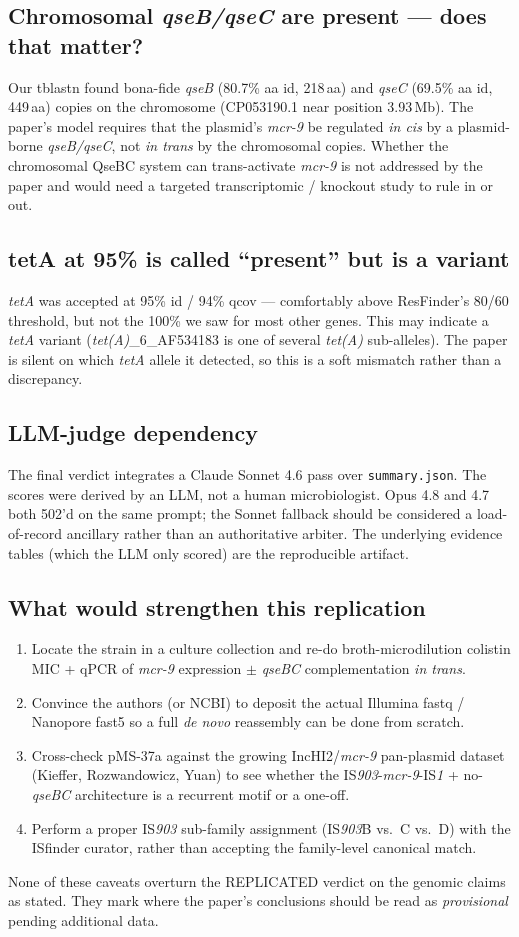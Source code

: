 \documentclass[11pt,letterpaper]{article}
\begin{document}
\subsection{Chromosomal \textit{qseB/qseC} are present --- does that matter?}
Our tblastn found bona-fide \textit{qseB} (80.7\% aa id, 218\,aa) and \textit{qseC} (69.5\% aa id, 449\,aa) copies on the chromosome (CP053190.1 near position 3.93\,Mb). The paper's model requires that the plasmid's \textit{mcr-9} be regulated \textit{in cis} by a plasmid-borne \textit{qseB/qseC}, not \textit{in trans} by the chromosomal copies. Whether the chromosomal QseBC system can trans-activate \textit{mcr-9} is not addressed by the paper and would need a targeted transcriptomic / knockout study to rule in or out.

\subsection{tetA at 95\% is called ``present'' but is a variant}
\textit{tetA} was accepted at 95\% id / 94\% qcov --- comfortably above ResFinder's 80/60 threshold, but not the 100\% we saw for most other genes. This may indicate a \textit{tetA} variant (\textit{tet(A)}\_6\_AF534183 is one of several \textit{tet(A)} sub-alleles). The paper is silent on which \textit{tetA} allele it detected, so this is a soft mismatch rather than a discrepancy.

\subsection{LLM-judge dependency}
The final verdict integrates a Claude Sonnet 4.6 pass over \texttt{summary.json}. The scores were derived by an LLM, not a human microbiologist. Opus 4.8 and 4.7 both 502'd on the same prompt; the Sonnet fallback should be considered a load-of-record ancillary rather than an authoritative arbiter. The underlying evidence tables (which the LLM only scored) are the reproducible artifact.

\subsection{What would strengthen this replication}
\begin{enumerate}
\item Locate the strain in a culture collection and re-do broth-microdilution colistin MIC + qPCR of \textit{mcr-9} expression $\pm$ \textit{qseBC} complementation \textit{in trans}.
\item Convince the authors (or NCBI) to deposit the actual Illumina fastq / Nanopore fast5 so a full \textit{de novo} reassembly can be done from scratch.
\item Cross-check pMS-37a against the growing IncHI2/\textit{mcr-9} pan-plasmid dataset (Kieffer, Rozwandowicz, Yuan) to see whether the IS\textit{903}-\textit{mcr-9}-IS\textit{1} + no-\textit{qseBC} architecture is a recurrent motif or a one-off.
\item Perform a proper IS\textit{903} sub-family assignment (IS\textit{903}B vs.\ C vs.\ D) with the ISfinder curator, rather than accepting the family-level canonical match.
\end{enumerate}

None of these caveats overturn the REPLICATED verdict on the genomic claims as stated. They mark where the paper's conclusions should be read as \textit{provisional} pending additional data.
\end{document}
